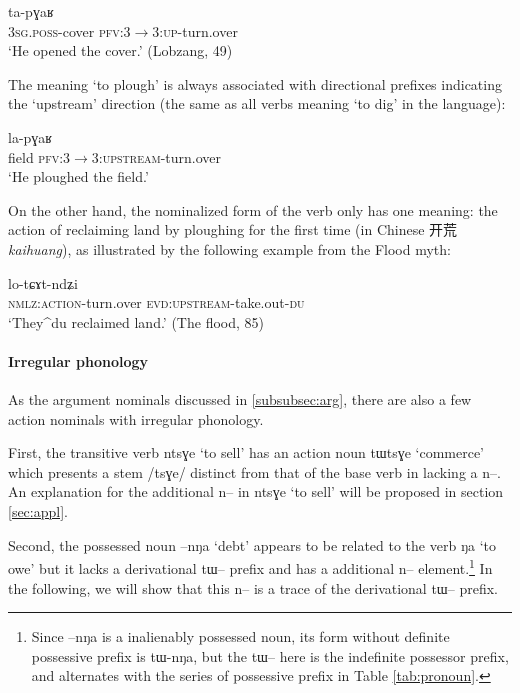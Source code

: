 \documentclass[oldfontcommands,oneside,a4paper,11pt]{article}
\newcommand{\ipa}[1]{{\phon \mbox{#1}}} %
\newcommand{\zh}[1]{{\cn #1}}
\begin{document}
   \begin{exe} \label{ex:tapGaR}
\ex
\gll   \ipa{ɯ-fkaβ} \ipa{ta-pɣaʁ} \\
 \textsc{3sg.poss}-cover \textsc{pfv:3$\rightarrow$3:up}-turn.over \\
 \glt  `He opened the cover.' (Lobzang, 49)
\end{exe} 


The meaning `to plough' is always associated with directional prefixes indicating the `upstream' direction (the same as all verbs meaning `to dig' in the language):
   \begin{exe} \label{ex:lapGaR}
\ex
\gll   \ipa{tɯji} \ipa{la-pɣaʁ} \\
field \textsc{pfv:3$\rightarrow$3:upstream}-turn.over \\
 \glt  `He ploughed the field.'
\end{exe} 

On the other hand, the nominalized form of the verb only has one meaning: the action of reclaiming land by ploughing for the first time (in Chinese \zh{开荒} \textit{kaihuang}), as illustrated by the following example from the Flood myth:

\begin{exe} \label{ex:tWpGaR}
\ex
\gll   \ipa{tɯ-pɣaʁ} \ipa{lo-tɕɤt-ndʑi} \\
\textsc{nmlz:action}-turn.over \textsc{evd:upstream}-take.out-\textsc{du} \\
 \glt  `They^{du} reclaimed land.' (The flood, 85)
\end{exe}

\paragraph{Irregular phonology}
As the argument nominals discussed in \ref{subsubsec:arg}, there are also a few action nominals with irregular phonology. 

First, the transitive verb \ipa{ntsɣe} `to sell' has an  action noun \ipa{tɯtsɣe} `commerce'  which presents a stem /\ipa{tsɣe}/ distinct from that of the base verb in lacking a \ipa{n--}. An explanation for the additional \ipa{n}-- in  \ipa{ntsɣe} `to sell' will be proposed in section \ref{sec:appl}.

Second,  the possessed noun \ipa{--nŋa} `debt' appears to be related to the verb \ipa{ŋa} `to owe' but it lacks a derivational \ipa{tɯ}-- prefix and has a additional \ipa{n}-- element.\footnote{Since \ipa{--nŋa} is a inalienably possessed noun, its form without definite possessive prefix is \ipa{tɯ-nŋa}, but the \ipa{tɯ--} here is the indefinite possessor prefix, and alternates with the series of possessive prefix in Table \ref{tab:pronoun}. } In the following, we will show that this \ipa{n--} is a trace of the derivational \ipa{tɯ}-- prefix.
\end{document}
